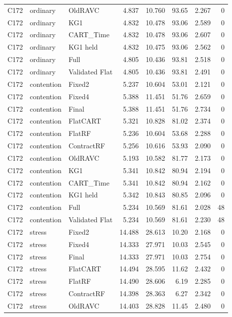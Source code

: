 \begin{longtable}{@{}lllrrrrr@{}}
C172 & ordinary & OldRAVC & 4.837 & 10.760 & 93.65 & 2.267 & 0\\
C172 & ordinary & KG1 & 4.832 & 10.478 & 93.06 & 2.589 & 0\\
C172 & ordinary & CART\_Time & 4.832 & 10.478 & 93.06 & 2.607 & 0\\
C172 & ordinary & KG1 held & 4.832 & 10.475 & 93.06 & 2.562 & 0\\
C172 & ordinary & Full & 4.805 & 10.436 & 93.81 & 2.518 & 0\\
C172 & ordinary & Validated Flat & 4.805 & 10.436 & 93.81 & 2.491 & 0\\
C172 & contention & Fixed2 & 5.237 & 10.604 & 53.01 & 2.121 & 0\\
C172 & contention & Fixed4 & 5.388 & 11.451 & 51.76 & 2.659 & 0\\
C172 & contention & Final & 5.388 & 11.451 & 51.76 & 2.734 & 0\\
C172 & contention & FlatCART & 5.321 & 10.828 & 81.02 & 2.374 & 0\\
C172 & contention & FlatRF & 5.236 & 10.604 & 53.68 & 2.288 & 0\\
C172 & contention & ContractRF & 5.256 & 10.616 & 53.93 & 2.090 & 0\\
C172 & contention & OldRAVC & 5.193 & 10.582 & 81.77 & 2.173 & 0\\
C172 & contention & KG1 & 5.341 & 10.842 & 80.94 & 2.194 & 0\\
C172 & contention & CART\_Time & 5.341 & 10.842 & 80.94 & 2.162 & 0\\
C172 & contention & KG1 held & 5.342 & 10.843 & 80.85 & 2.096 & 0\\
C172 & contention & Full & 5.234 & 10.569 & 81.61 & 2.028 & 48\\
C172 & contention & Validated Flat & 5.234 & 10.569 & 81.61 & 2.230 & 48\\
C172 & stress & Fixed2 & 14.488 & 28.613 & 10.20 & 2.168 & 0\\
C172 & stress & Fixed4 & 14.333 & 27.971 & 10.03 & 2.545 & 0\\
C172 & stress & Final & 14.333 & 27.971 & 10.03 & 2.754 & 0\\
C172 & stress & FlatCART & 14.494 & 28.595 & 11.62 & 2.432 & 0\\
C172 & stress & FlatRF & 14.490 & 28.606 & 6.19 & 2.285 & 0\\
C172 & stress & ContractRF & 14.398 & 28.363 & 6.27 & 2.342 & 0\\
C172 & stress & OldRAVC & 14.403 & 28.828 & 11.45 & 2.480 & 0\\

\end{longtable}
